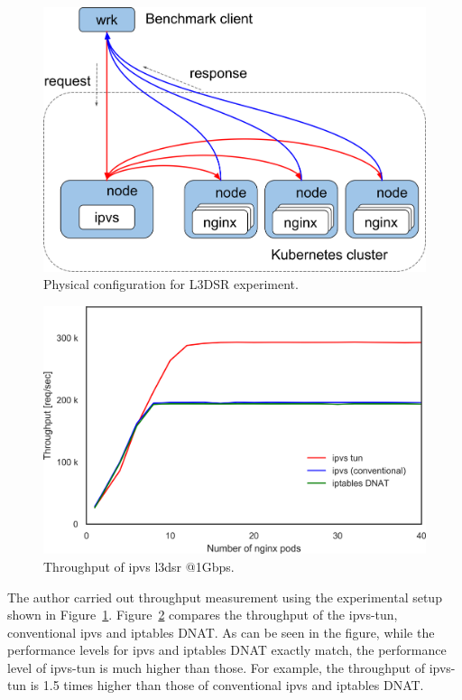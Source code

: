 \begin{figure}[h]
  \centering
  \includegraphics[width=0.8\columnwidth]{Figs/benchmark-schem-dsr}
  \par\bigskip
  \centering
  \begin{minipage}{0.8\columnwidth}
    \caption{Physical configuration for L3DSR experiment.}
    \label{fig:benchmark-schem-dsr}
  \end{minipage}
\end{figure}

\begin{figure}[h]
  \centering
  \includegraphics[width=0.8\columnwidth]{Figs/ipvs_l3dsr_1g.png}
  \par\bigskip
  \centering
  \begin{minipage}{0.8\columnwidth}
    \caption{Throughput of ipvs l3dsr @1Gbps.}
    \label{fig:ipvs_l3dsr_1g.png}
  \end{minipage}
\end{figure}

The author carried out throughput measurement using the experimental setup shown in Figure~\ref{fig:benchmark-schem-dsr}.
Figure~\ref{fig:ipvs_l3dsr_1g.png} compares the throughput of the ipvs-tun, conventional ipvs and iptables DNAT.
As can be seen in the figure, while the performance levels for ipvs and iptables DNAT exactly match, the performance level of ipvs-tun is much higher than those.
For example, the throughput of ipvs-tun is 1.5 times higher than those of conventional ipvs and iptables DNAT.

